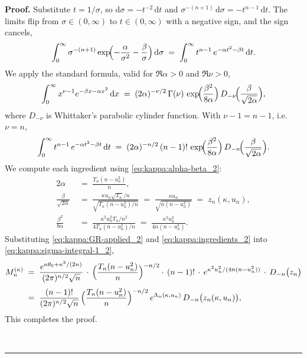 \documentclass{article}%
\newenvironment{proof}[1][Proof]{\noindent\textbf{#1.} }{\ \rule{0.5em}{0.5em}}
\begin{document}
\begin{proof}
Substitute $t = 1/\sigma$, so $\mathrm{d}\sigma = -t^{-2}\, \mathrm{d}t$
and $\sigma^{-(n+1)}\, \mathrm{d}\sigma = -t^{n-1}\, \mathrm{d}t$.  The
limits flip from $\sigma \in (0, \infty)$ to $t \in (0, \infty)$ with a negative sign, and
the sign cancels,
\begin{equation}
  \int_0^\infty \sigma^{-(n+1)}
  \exp\!\Bigl(-\frac{\alpha}{\sigma^2} - \frac{\beta}{\sigma}\Bigr)\,
  \mathrm{d}\sigma
  \;=\;
  \int_0^\infty t^{n-1}\, e^{-\alpha t^2 - \beta t}\, \mathrm{d}t.
  \label{eq:kappa:sub_2}
\end{equation}
We apply the standard formula, valid for $\Re\alpha > 0$ and $\Re\nu > 0$,
\begin{equation}
  \int_0^\infty x^{\nu - 1} e^{-\beta x - \alpha x^2}\, \mathrm{d}x
  \;=\;
  (2\alpha)^{-\nu/2}\, \Gamma(\nu)\,
  \exp\!\Bigl(\frac{\beta^2}{8\alpha}\Bigr)\,
  D_{-\nu}\!\Bigl(\frac{\beta}{\sqrt{2\alpha}}\Bigr),
  \label{eq:kappa:GR_2}
\end{equation}
where $D_{-\nu}$ is Whittaker's parabolic cylinder function.  With
$\nu - 1 = n - 1$, i.e.\ $\nu = n$,
\begin{equation}
  \int_0^\infty t^{n-1}\, e^{-\alpha t^2 - \beta t}\, \mathrm{d}t
  \;=\;
  (2\alpha)^{-n/2}\, (n-1)!\,
  \exp\!\Bigl(\frac{\beta^2}{8\alpha}\Bigr)\,
  D_{-n}\!\Bigl(\frac{\beta}{\sqrt{2\alpha}}\Bigr).
  \label{eq:kappa:GR-applied_2}
\end{equation}
We compute each ingredient using \eqref{eq:kappa:alpha-beta_2}:
\begin{align}
  2\alpha &\;=\; \frac{T_n(n - u_n^2)}{n},
  \nonumber\\[0.2em]
  \frac{\beta}{\sqrt{2\alpha}}
  &\;=\;
  \frac{\kappa u_n \sqrt{T_n}/n}%
       {\sqrt{T_n(n - u_n^2)/n}}
  \;=\;
  \frac{\kappa u_n}{\sqrt{n(n - u_n^2)}}
  \;=\; z_n(\kappa, u_n),
  \nonumber\\[0.2em]
  \frac{\beta^2}{8\alpha}
  &\;=\;
  \frac{\kappa^2 u_n^2 T_n / n^2}%
       {4 T_n(n - u_n^2)/n}
  \;=\;
  \frac{\kappa^2 u_n^2}{4 n (n - u_n^2)}.
  \label{eq:kappa:ingredients_2}
\end{align}
Substituting \eqref{eq:kappa:GR-applied_2} and
\eqref{eq:kappa:ingredients_2} into
\eqref{eq:kappa:sigma-integral-1_2},
\begin{align*}
  M_n^{(\kappa)}
  &\;=\;
  \frac{e^{\kappa \theta_0 + \kappa^2/(2n)}}{(2\pi)^{n/2}\sqrt n}\,
  \cdot\,
  \Bigl(\frac{T_n(n - u_n^2)}{n}\Bigr)^{-n/2}
  \cdot\, (n-1)!\,
  \cdot\,
  e^{\kappa^2 u_n^2 / (4 n (n - u_n^2))}\,
  \cdot\,
  D_{-n}\bigl(z_n\bigr)
  \\[0.3em]
  &\;=\;
  \frac{(n-1)!}{(2\pi)^{n/2}\sqrt n}\,
  \Bigl(\frac{T_n(n - u_n^2)}{n}\Bigr)^{-n/2}\,
  e^{\Lambda_n(\kappa, u_n)}\,
  D_{-n}\bigl(z_n(\kappa, u_n)\bigr),
\end{align*}
This completes the proof. 


\end{proof}
\end{document}
